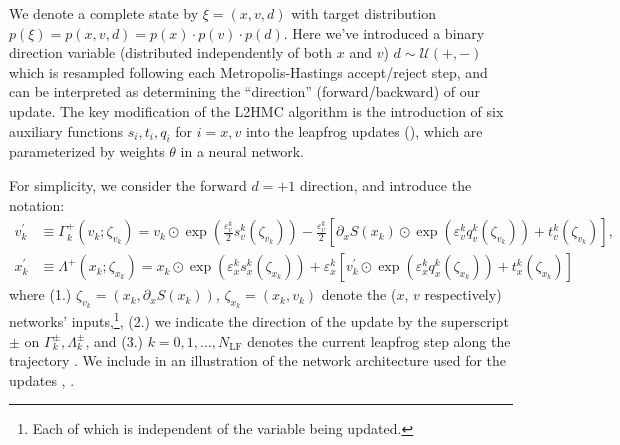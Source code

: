 \documentclass{article} %
\begin{document}
We denote a complete state by \(\xi = (x, v, d)\) with target distribution \(p(\xi) = p(x, v, d) = p(x)\cdot p(v)\cdot
p(d)\).
%
Here we've introduced a binary direction variable (distributed independently of both \(x\) and \(v\))
\(d\sim\mathcal{U}(+,-)\) which is resampled following each Metropolis-Hastings accept/reject step, and can be
interpreted as determining the ``direction'' (forward/backward) of our update.
%
The key modification of the L2HMC algorithm is the introduction of six auxiliary functions \(s_{i}, t_{i}, q_{i}\) for \(i
= x, v\) into the leapfrog updates (), which are parameterized by weights \(\theta\) in a neural network.
%

For simplicity, we consider the forward \(d=+1\) direction, and introduce the notation:
%
\begin{align}
   v^{\prime}_{k} &\equiv \Gamma^{+}_{k}(v_{k};\zeta_{v_{k}})
   = v_{k}\odot \exp{\left(\tfrac{\varepsilon^{k}_{v}}{2}s_{v}^{k}(\zeta_{v_{k}})\right)} -
   \tfrac{\varepsilon^{k}_{v}}{2}{\left[\partial_{x}S(x_{k})\odot\exp{\left(\varepsilon^{k}_{v} q_{v}^{k}(\zeta_{v_{k}})\right)}
      +t_{v}^{k}(\zeta_{v_{k}})\right]},\label{eq:new_momentum_update}\\
   x^{\prime}_{k} &\equiv \Lambda^{+}(x_{k};\zeta_{x_{k}})
   = x_{k}\odot\exp(\varepsilon^{k}_{x} s^{k}_{x}(\zeta_{x_{k}}))
   + \varepsilon^{k}_{x}\left[v^{\prime}_{k}\odot\exp(\varepsilon^{k}_{x} q^{k}_{x}(\zeta_{x_{k}}))
         + t^{k}_{x}(\zeta_{x_{k}})\right]\label{eq:new_position_update}
\end{align}
%
where (1.) \(\zeta_{v_{k}} = (x_{k}, \partial_{x}S(x_{k}))\), \(\zeta_{x_{k}} = (x_{k}, v_{k})\) denote the (\(x\),
\(v\) respectively) networks' inputs,\footnote{%
   Each of which is independent of the variable being updated.
}, (2.) we indicate the direction of the update by the superscript \(\pm\) on \(\Gamma^{\pm}_{k},
\Lambda^{\pm}_{k}\), and (3.) \(k=0,1,\ldots,N_{\mathrm{LF}}\) denotes the current leapfrog step along the trajectory .
%
We include in  an illustration of the network architecture used for the updates , .
%
\end{document}
